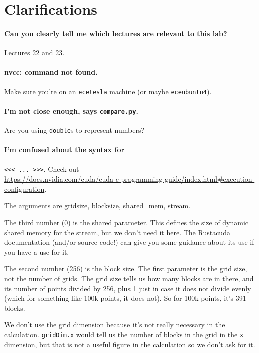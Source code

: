 \section*{Clarifications}

\paragraph{Can you clearly tell me which lectures are relevant to this lab?} Lectures 22 and 23.

\paragraph{nvcc: command not found.} Make sure you're on an \texttt{ecetesla} machine (or maybe \texttt{eceubuntu4}).

\paragraph{I'm not close enough, says \texttt{compare.py}.} Are you using \texttt{double}s to represent numbers?

\paragraph{I'm confused about the syntax for}\verb+<<< ... >>>+. Check out\\
\url{https://docs.nvidia.com/cuda/cuda-c-programming-guide/index.html#execution-configuration}.

The arguments are gridsize, blocksize, shared\_mem, stream.

The third number (0) is the shared parameter. This defines the size of dynamic shared memory for the stream, but we don’t need it here. The Rustacuda documentation (and/or source code!) can give you some guidance about its use if you have a use for it.

The second number (256) is the block size. The first parameter is the grid size, not the number of grids. The grid size tells us how many blocks are in there, and its number of points divided by 256, plus 1 just in case it does not divide evenly (which for something like 100k points, it does not). So for 100k points, it’s 391 blocks.

We don't use the grid dimension because it's not really necessary in the calculation. \texttt{gridDim.x} would tell us the number of blocks in the grid in the \texttt{x} dimension, but that is not a useful figure in the calculation so we don't ask for it.

